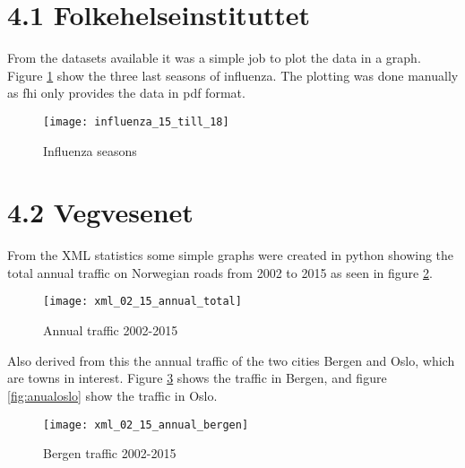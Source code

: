\section*{4.1 Folkehelseinstituttet}
From the datasets available it was a simple job to plot the data in a graph. Figure \ref{fig:infstat} show the three last seasons of influenza. The plotting was done manually as fhi only provides the data in pdf format.

\begin{figure}[ht]
\texttt{[image: influenza\_15\_till\_18]}
\centering
\caption{Influenza seasons}
\label{fig:infstat}
\end{figure}

\newpage

\section*{4.2 Vegvesenet}
From the XML statistics some simple graphs were created in python showing the total annual traffic on Norwegian roads from 2002 to 2015 as seen in figure \ref{fig:anualtotal}. 

\begin{figure}[ht]
\texttt{[image: xml\_02\_15\_annual\_total]}
\centering
\caption{Annual traffic 2002-2015}
\label{fig:anualtotal}
\end{figure}

Also derived from this the annual traffic of the two cities Bergen and Oslo, which are towns in interest. Figure \ref{fig:anualbergen} shows the traffic in Bergen, and figure \ref{fig:anualoslo} show the traffic in Oslo.

\begin{figure}[ht]
\texttt{[image: xml\_02\_15\_annual\_bergen]}
\centering
\caption{Bergen traffic 2002-2015}
\label{fig:anualbergen}
\end{figure}

